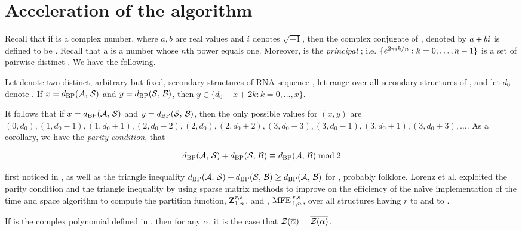 \section{Acceleration of the \ffttwo algorithm}
\label{sec:ffttwo:perf}

Recall that if \aPbi is a complex number, where $a,b$ are real values and $i$
denotes $\sqrt{-1}$, then the complex conjugate of \aPbi, denoted by
$\overline{a+bi}$ is defined to be \aMbi. Recall that a \nRoU is a number
whose $n$th power equals one. Moreover,
\pRoU is the {\em principal} \nRoU; i.e.
$\{ e^{2 \pi i k/n} : k=0,\dots,n-1 \}$ is a set of pairwise distinct
\nRoUs. We have the following.

\begin{lemma}
\label{lem:ffttwo:lemma1}
Let \strAB denote two distinct, arbitrary but fixed,
secondary structures of RNA sequence \seq, let \str range over
all secondary structures of \seq, and let $d_0$ denote \dBP{\strA}{\strB}.
If $x=d_{\text{BP}}(\mathcal A,\,\mathcal S)$ and $y=d_{\text{BP}}(\mathcal S,\,\mathcal B)$, then
$y \in \{ d_0-x+2k: k=0,\dots,x\}$.

It follows that if $x=d_{\text{BP}}(\mathcal A,\,\mathcal S)$ and $y=d_{\text{BP}}(\mathcal S,\,\mathcal B)$,
then the only possible values for
$(x,y)$ are $(0,d_0), (1,d_0-1), (1,d_0+1),
(2,d_0-2), (2,d_0), (2, d_0+2),
(3,d_0-3), (3,d_0-1), (3, d_0+1), (3,d_0+3), \dots$.
As a corollary, we have the {\em parity condition}, that

\begin{align}
\label{eq:ffttwo:parity}
\dBP{\strA}{\str} + \dBP{\str}{\strB} \equiv \dBP{\strA}{\strB} \bmod 2
\end{align}

first noticed in \citep{hofacker:RNAbor2D}, as well as
the triangle inequality
$d_{\text{BP}}(\mathcal A,\,\mathcal S) + d_{\text{BP}}(\mathcal S,\,\mathcal B) \geq d_{\text{BP}}(\mathcal A,\,\mathcal B)$
for \bpd, probably folklore.
Lorenz et al. \citep{hofacker:RNAbor2D} exploited the parity condition
and the triangle inequality by using sparse matrix methods to improve on
the efficiency of the na\"{\i}ve implementation of the
 time and  space algorithm to compute
the partition function, ${\bf Z}^{r,s}_{1,n}$,
and \mfes, $\text{MFE\,}^{r,s}_{1,n}$, over all
structures having \bpd $r$ to \strA and \str to \strB.
\end{lemma}

\begin{lemma}
\label{lem:ffttwo:lemma2}
If \fullZx is the complex polynomial defined in
, then for any \nRoU
$\alpha$, it is the case that ${\mathcal Z}_{}(\overline{\alpha}) =
\overline{{\mathcal Z}_{}(\alpha)}$.
\end{lemma}

